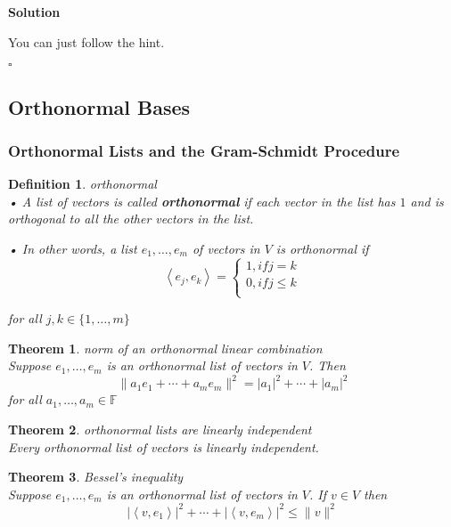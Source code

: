 \documentclass{article}
\newtheorem{theorem}{Theorem}[subsection]
\newtheorem{definition}{Definition}[subsection]
\newenvironment{solution}{%
{
    \textbf{Solution\\}
    }
}{
  \hfill $\square$ 
  \par\bigskip 
}
\newcommand{\FF}{\mathbb{F}}
\begin{document}
\begin{CJK}{UTF8}{gkai}
\begin{solution}
    You can just follow the hint.
\end{solution}

\subsection{Orthonormal Bases}
\subsubsection{Orthonormal Lists and the Gram-Schmidt Procedure}
\begin{definition}
    orthonormal\\

    • A list of vectors is called \textbf{orthonormal} if each vector in the list has  $1$ and is orthogonal to all the other vectors in the list.

    • In other words, a list $e_1,\ldots,e_m$ of vectors in $V$ is orthonormal if
    \[\left<e_j,e_k\right> = \begin{cases}
        1 , if j = k\\
        0 , if j \leq k\\
    \end{cases}\]

    for all $j, k \in \{1,\ldots,m\}$
\end{definition}

\begin{theorem}
    norm of an orthonormal linear combination\\

    Suppose $e_1,\ldots,e_m$ is an orthonormal list of vectors in $V$. Then
    \[\|a_1e_1 + \cdots+a_me_m\|^2 = |a_1|^2 + \cdots+|a_m|^2\]
    for all $a_1, \ldots,a_m \in \FF$
\end{theorem}

\begin{theorem}
    orthonormal lists are linearly independent\\

    Every orthonormal list of vectors is linearly independent.
\end{theorem}

\begin{theorem}
    Bessel's inequality\\

    Suppose $e_1,\ldots,e_m$ is an orthonormal list of vectors in $V$. If $v \in V$ then
    \[|\left<v, e_1\right>|^2 + \cdots + |\left<v,e_m\right>|^2 \leq \|v\|^2\]
\end{theorem}


\end{CJK}
\end{document}
